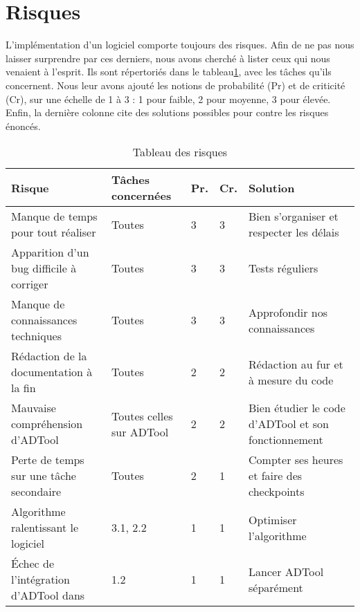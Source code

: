 \section{Risques}
	\label{sec:risques}

	L'implémentation d'un logiciel comporte toujours des risques. Afin de ne pas nous laisser surprendre par ces derniers, nous avons cherché à lister ceux qui nous venaient à l'esprit. Ils sont répertoriés dans le tableau\ref{fig:risques}, avec les tâches qu'ils concernent. Nous leur avons ajouté les notions de probabilité (Pr) et de criticité (Cr), sur une échelle de 1 à 3 : 1 pour faible, 2 pour moyenne, 3 pour élevée. Enfin, la dernière colonne cite des solutions possibles pour contre les risques énoncés.

	\begin{table}[h]
		\centering
		\begin{tabular}{|p{4cm}|l|l|l|p{4cm}|}
		\hline
            \textbf{Risque} & \textbf{Tâches concernées} & \textbf{Pr.} & \textbf{Cr.} & \textbf{Solution}\\
            \hline
            Manque de temps pour tout réaliser & 
                Toutes & 3 & 3 &
                Bien s'organiser et respecter les délais\\ 
            \hline
            Apparition d'un bug difficile à corriger & 
                Toutes & 3 & 3 &
                Tests réguliers\\ 
            \hline
            Manque de connaissances techniques & 
                Toutes & 3 & 3 &
                Approfondir nos connaissances\\ 
            \hline
            Rédaction de la documentation à la fin & 
                Toutes & 2 & 2 &
                Rédaction au fur et à mesure du code\\
            \hline
            Mauvaise compréhension d'ADTool & 
                Toutes celles sur ADTool & 2 & 2 &
                Bien étudier le code d'ADTool et son fonctionnement\\ 
            \hline
            Perte de temps sur une tâche secondaire & 
                Toutes & 2 & 1 &
                Compter ses heures et faire des checkpoints\\ 
            \hline
            Algorithme ralentissant le logiciel & 
                3.1, 2.2 & 1 & 1 &
                Optimiser l’algorithme\\ 
            \hline
            Échec de l'intégration d'ADTool dans \glasir{} & 
                1.2 & 1 & 1 &
                Lancer ADTool séparément\\ 
            \hline
		\end{tabular}
		\caption{Tableau des risques}
		\label{fig:risques}
	\end{table}
